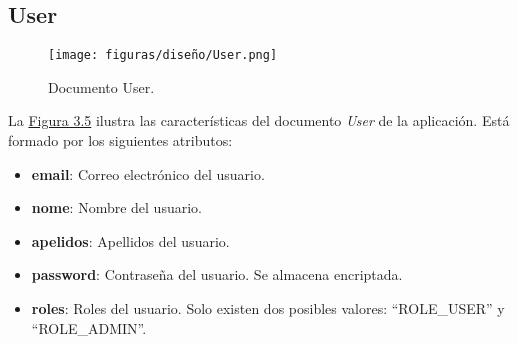 \subsection{User}

\begin{figure}[H]
\centerline{\texttt{[image: figuras/diseño/User.png]}}
\caption{Documento User.}
\label{enlaceUser}
\end{figure}

La \hyperref[enlaceUser]{Figura 3.5} ilustra las características del documento {\it User} de la aplicación. Está formado por los siguientes atributos:

\begin{itemize}
    \item {\bf email}: Correo electrónico del usuario.
    \item {\bf nome}: Nombre del usuario.
    \item {\bf apelidos}: Apellidos del usuario.
    \item {\bf password}: Contraseña del usuario. Se almacena encriptada.
    \item {\bf roles}: Roles del usuario. Solo existen dos posibles valores: ``ROLE\_USER'' y ``ROLE\_ADMIN''.
\end{itemize}